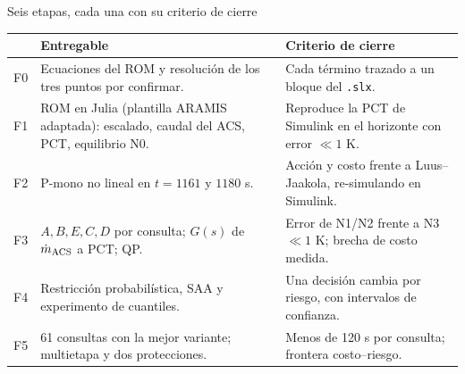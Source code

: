 \documentclass[aspectratio=169,10pt]{beamer}
\newcommand{\md}{\dot m}
\begin{document}
\begin{frame}{Seis etapas, cada una con su criterio de cierre}
\vspace{-.05cm}
\centering
{}
\vspace{.1cm}
\scriptsize
\renewcommand{\arraystretch}{1.18}
\begin{tabular}{@{}L{.6cm}L{6.3cm}L{6.5cm}@{}}
\toprule
& \textbf{Entregable} & \textbf{Criterio de cierre}\\
\midrule
F0 & Ecuaciones del ROM y resolución de los tres puntos por confirmar. & Cada término trazado a un bloque del \texttt{.slx}.\\
F1 & ROM en Julia (plantilla ARAMIS adaptada): escalado, caudal del ACS, PCT, equilibrio N0. & Reproduce la PCT de Simulink en el horizonte con error $\ll1$ K.\\
F2 & P-mono no lineal en $t=1161$ y $1180$ s. & Acción y costo frente a Luus--Jaakola, re-simulando en Simulink.\\
F3 & $A,B,E,C,D$ por consulta; $G(s)$ de $\md_{\rm ACS}$ a PCT; QP. & Error de N1/N2 frente a N3 $\ll1$ K; brecha de costo medida.\\
F4 & Restricción probabilística, SAA y experimento de cuantiles. & Una decisión cambia por riesgo, con intervalos de confianza.\\
F5 & 61 consultas con la mejor variante; multietapa y dos protecciones. & Menos de 120 s por consulta; frontera costo--riesgo.\\
\bottomrule
\end{tabular}
\end{frame}
\end{document}
